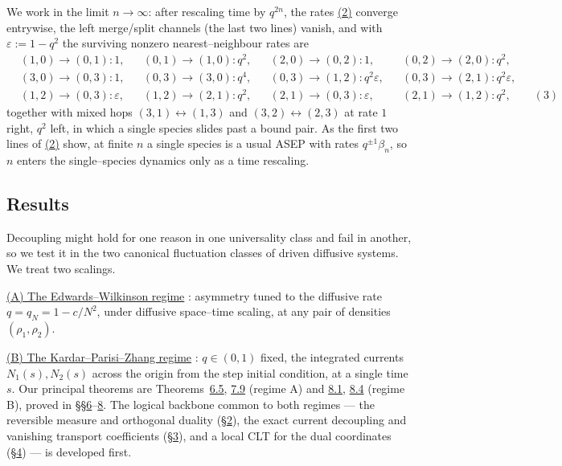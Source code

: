\documentclass[11pt]{article}
\theoremstyle{plain}
\theoremstyle{definition}
\theoremstyle{remark}
\newcommand{\eps}{\varepsilon}\newcommand{\Exp}{\mathrm{Exp}}
\begin{document}
We work in the limit $n\to\infty$: after rescaling time by $q^{2n}$, the rates
\hyperref[eq_nrates]{(2)} converge entrywise, the left merge/split channels (the last two
lines) vanish, and with $\eps:=1-q^2$ the surviving nonzero nearest--neighbour rates
are
\label{eq_rates}
\begin{equation}
\begin{aligned}
&(1,0)\!\to\!(0,1):1, &&(0,1)\!\to\!(1,0):q^2, &&(2,0)\!\to\!(0,2):1, &&(0,2)\!\to\!(2,0):q^2,\\
&(3,0)\!\to\!(0,3):1, &&(0,3)\!\to\!(3,0):q^4, &&(0,3)\!\to\!(1,2):q^2\eps, &&(0,3)\!\to\!(2,1):q^2\eps,\\
&(1,2)\!\to\!(0,3):\eps, &&(1,2)\!\to\!(2,1):q^2, &&(2,1)\!\to\!(0,3):\eps, &&(2,1)\!\to\!(1,2):q^2,
\qquad(3)
\end{aligned}
\end{equation}
together with mixed hops $(3,1)\!\leftrightarrow\!(1,3)$ and
$(3,2)\!\leftrightarrow\!(2,3)$ at rate $1$ right, $q^2$ left, in which a single
species slides past a bound pair. As the first two lines of \hyperref[eq_nrates]{(2)} show,
at finite $n$ a single species is a usual ASEP with rates $q^{\pm1}\beta_n$, so $n$
enters the single--species dynamics only as a time rescaling.

\subsection{Results}\label{sec_introresults}
Decoupling might hold for one reason in one universality class and fail in another, so
we test it in the two canonical fluctuation classes of driven diffusive systems. We
treat two scalings. 

\underline{(A) The Edwards--Wilkinson regime} \cite{EW}: asymmetry tuned to
the diffusive rate $q=q_N=1-c/N^2$, under diffusive space--time scaling, at any pair of
densities $(\rho_1,\rho_2)$. 

\underline{(B) The Kardar--Parisi--Zhang
regime} \cite{KPZ}: $q\in(0,1)$ fixed, the integrated currents $N_1(s),N_2(s)$ across the origin
from the step initial condition, at a single time $s$. Our principal theorems are
Theorems~\hyperref[thm_ewmain]{6.5}, \hyperref[thm_closed]{7.9} (regime A) and \hyperref[thm_marg]{8.1},
\hyperref[thm_cov]{8.4} (regime B), proved in \S\S\hyperref[sec_ew]{6}--\hyperref[sec_tw]{8}. The logical
backbone common to both regimes --- the reversible measure and orthogonal duality
(\S\hyperref[sec_model]{2}), the exact current decoupling and vanishing transport
coefficients (\S\hyperref[sec_decouple]{3}), and a local CLT for the dual coordinates
(\S\hyperref[sec_lclt]{4}) --- is developed first.
\end{document}
